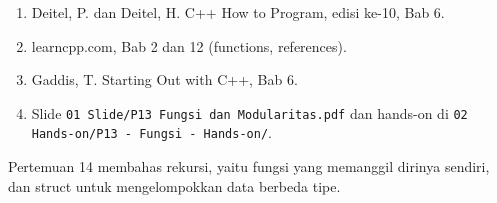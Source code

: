 \documentclass[a4paper]{article}
\begin{document}
\begin{enumerate}
\item Deitel, P. dan Deitel, H. C++ How to Program, edisi ke-10, Bab 6.
\item learncpp.com, Bab 2 dan 12 (functions, references).
\item Gaddis, T. Starting Out with C++, Bab 6.
\item Slide \texttt{01 Slide/P13 Fungsi dan Modularitas.pdf} dan hands-on di \texttt{02 Hands-on/P13 - Fungsi - Hands-on/}.
\end{enumerate}
\begin{Penting}
Pertemuan 14 membahas rekursi, yaitu fungsi yang memanggil dirinya sendiri, dan struct untuk mengelompokkan data berbeda tipe.
\end{Penting}
\end{document}
